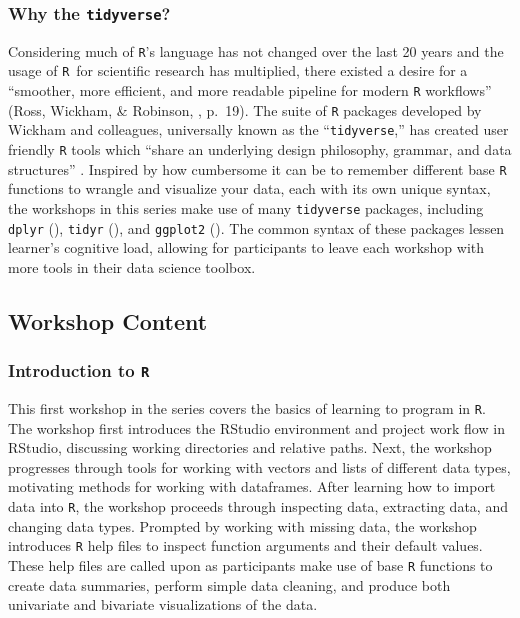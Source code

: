 \documentclass[12pt]{article}
\newcommand{\R}{\texttt{R}}
\begin{document}

\subsubsection{Why the \texttt{tidyverse}?}

\noindent Considering much of \texttt{R}'s language has not changed over the 
last 20 years and the usage of \R~for scientific research has multiplied, there
existed a desire for a ``smoother, more efficient, and more readable pipeline
for modern \texttt{R} workflows'' (Ross, Wickham, \& Robinson, 
\citeyear{tidytools}, p.\ 19). The suite of \texttt{R} packages developed by 
Wickham and colleagues, universally known as the ``\texttt{tidyverse},'' has 
created user friendly \texttt{R} tools which ``share an underlying design
philosophy, grammar, and data structures'' \citep{tidyverse}. Inspired by how
cumbersome it can be to remember different base \texttt{R} functions to wrangle
and visualize your data, each with its own unique syntax, the workshops in this
series make use of many \texttt{tidyverse} packages, including \texttt{dplyr}
(\citeyear{dplyr}), \texttt{tidyr} (\citeyear{tidyr}), and  \texttt{ggplot2}
(\citeyear{ggplot}). The common syntax of these packages lessen learner's 
cognitive load, allowing for participants to leave each workshop with more tools
in their data science toolbox. 

\subsection{Workshop Content}

\subsubsection{Introduction to \texttt{R}}
\label{sec:introR}

\noindent This first workshop in the series covers the basics of learning to
program in \texttt{R}. The workshop first introduces the RStudio environment and
project work flow in RStudio, discussing working directories and relative paths.
Next, the workshop progresses through tools for working with vectors and lists 
of different data types, motivating methods for working with dataframes. After
learning how to import data into \texttt{R}, the workshop proceeds through
inspecting data, extracting data, and changing data types. Prompted by working
with missing data, the workshop introduces \texttt{R} help files to inspect
function arguments and their default values. These help files are called upon
as participants make use of base \texttt{R} functions to create data summaries,
perform simple data cleaning, and produce both univariate and bivariate
visualizations of the data. 
\end{document}
